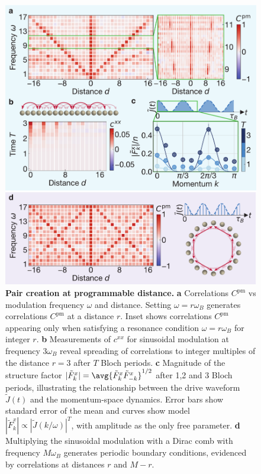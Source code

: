 \documentclass[aps,pra,twocolumn,superscriptaddress]{revtex4-1} %
\begin{document}
\begin{bibunit}
\begin{figure}[tbh]
\includegraphics[width=\columnwidth]{Figures/Figure2.pdf}
\caption{\textbf{Pair creation at programmable distance.}  \textbf{a} Correlations $C^{\mathrm{pm}}$ vs modulation frequency $\omega$ and distance. Setting $\omega = r\omega_B$ generates correlations $C^\text{pm}$ at a distance
$r$.  Inset shows correlations $C^\text{pm}$ appearing only when satisfying a
resonance condition $\omega = r\omega_B$ for integer $r$.  \textbf{b} Measurements of $c^{xx}$ for sinusoidal modulation at frequency $3\omega_B$ reveal spreading of correlations to integer multiples of the distance $r=3$ after $T$ Bloch periods.
\textbf{c} Magnitude of the structure factor $|\tilde{F}_k^x| = \avg{\tilde{F}^x_{k}\tilde{F}^x_{-k}}^{1/2}$ after 1,2 and 3 Bloch periods, illustrating the relationship between the drive waveform $\tilde{J}(t)$ and the momentum-space dynamics. Error bars show standard error of the mean and curves show model $|\tilde{F}^x_k| \propto |\tilde{J}(k/\omega)|^T$, with amplitude as the only free parameter.
\textbf{d} Multiplying the sinusoidal modulation with a Dirac comb with frequency $M\omega_B$
generates periodic boundary conditions, evidenced by correlations at distances $r$ and $M-r$.}
\label{fig:sideband_frequency}
\end{figure}


\end{bibunit}
\end{document}
